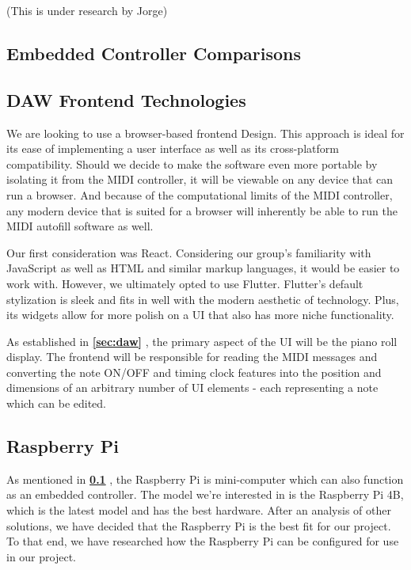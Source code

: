 (This is under research by Jorge)


\subsection{Embedded Controller Comparisons}
\label{sec:embedded_controllers}

\blindtext

\subsection{DAW Frontend Technologies}

We are looking to use a browser-based frontend Design. This approach is ideal for its ease
of implementing a user interface as well as its cross-platform compatibility. Should we
decide to make the software even more portable by isolating it from the MIDI controller,
it will be viewable on any device that can run a browser. And because of the computational
limits of the MIDI controller, any modern device that is suited for a browser will
inherently be able to run the MIDI autofill software as well.

Our first consideration was React. Considering our group's familiarity with JavaScript as
well as HTML and similar markup languages, it would be easier to work with. However, we
ultimately opted to use Flutter. Flutter's default stylization is sleek and fits in well
with the modern aesthetic of technology. Plus, its widgets allow for more polish on a UI
that also has more niche functionality.

As established in \textbf{\ref{sec:daw} }, the primary aspect of the UI
will be the piano roll display. The frontend will be responsible for reading the MIDI
messages and converting the note ON/OFF and timing clock features into the position and
dimensions of an arbitrary number of UI elements - each representing a note which can be
edited.

\subsection{Raspberry Pi}

As mentioned in \textbf{\ref{sec:embedded_controllers} },
the Raspberry Pi is mini-computer which can also function as an embedded controller. The
model we're interested in is the Raspberry Pi 4B, which is the latest model and has the
best hardware. After an analysis of other solutions, we have decided that the
Raspberry Pi is the best fit for our project. To that end, we have researched how the
Raspberry Pi can be configured for use in our project.

